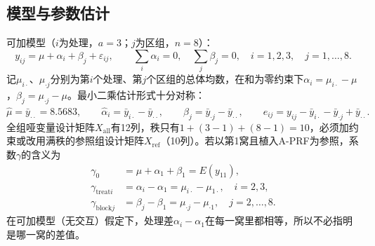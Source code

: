 \subsection{模型与参数估计}
可加模型（$i$为处理，$a=3$；$j$为区组，$n=8$）：
\[
y_{ij}=\mu+\alpha_i+\beta_j+\varepsilon_{ij},\qquad\sum_i\alpha_i=0,\quad\sum_j\beta_j=0,
\quad i=1,2,3,\quad j=1,\ldots,8 .
\]
记$\mu_{i\cdot}$、$\mu_{\cdot j}$分别为第$i$个处理、第$j$个区组的总体均数，在和为零约束下$\alpha_i=\mu_{i\cdot}-\mu$，$\beta_j=\mu_{\cdot j}-\mu$。最小二乘估计形式十分对称：
\[
\widehat\mu=\bar y_{\cdot\cdot}=8.5683,\qquad
\widehat\alpha_i=\bar y_{i\cdot}-\bar y_{\cdot\cdot},\qquad
\widehat\beta_j=\bar y_{\cdot j}-\bar y_{\cdot\cdot},\qquad
e_{ij}=y_{ij}-\bar y_{i\cdot}-\bar y_{\cdot j}+\bar y_{\cdot\cdot}.
\]
全组哑变量设计矩阵$X_{\mathrm{all}}$有12列，秩只有$1+(3-1)+(8-1)=10$，必须加约束或改用满秩的参照组设计矩阵$X_{\mathrm{ref}}$（10列）。若以第1窝且植入A-PRF为参照，系数$\gamma$的含义为
\begin{align*}
\gamma_0&=\mu+\alpha_1+\beta_1=E(y_{11}),\\
\gamma_{\mathrm{treat}i}&=\alpha_i-\alpha_1=\mu_{i\cdot}-\mu_{1\cdot},\quad i=2,3,\\
\gamma_{\mathrm{block}j}&=\beta_j-\beta_1=\mu_{\cdot j}-\mu_{\cdot1},\quad j=2,\ldots,8.
\end{align*}
在可加模型（无交互）假定下，处理差$\alpha_i-\alpha_1$在每一窝里都相等，所以不必指明是哪一窝的差值。
